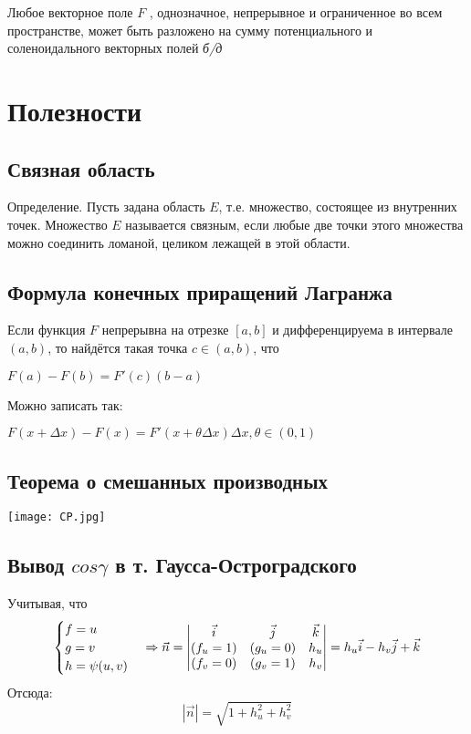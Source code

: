 \documentclass[12pt]{article}
\begin{document}
		Любое векторное поле $F$ , однозначное, непрерывное и ограниченное во всем пространстве, может быть разложено на сумму потенциального и соленоидального векторных полей	
	\textit{б/д}
	
	
	
	
	
	
	
	
	
	
	
\newpage
\section{Полезности}
\subsection{Связная область}\label{eq4}
Определение. Пусть задана область $E$, т.е. множество, состоящее из внутренних точек. Множество $E$ называется связным, если любые две точки этого
множества можно соединить ломаной, целиком лежащей в этой области.

\subsection{Формула конечных приращений Лагранжа}\label{eq5}	
Если функция $F$ непрерывна на отрезке $[a,b]$  и дифференцируема в интервале $(a,b)$, то найдётся такая точка $ c\in (a,b)$, что
 
	$F(a) - F(b) = F'(c)(b - a)$
	
	Можно записать так:
	
	$F(x + \Delta x) - F(x) = F'(x + \theta\Delta x)\Delta x , \theta \in (0,1) $

\subsection{Теорема о смешанных производных}\label{eq6}
\texttt{[image: CP.jpg]}	

\subsection{Вывод $cos\gamma$ в т. Гаусса-Остроградского}\label{eq10}
Учитывая, что 
$$
\begin{cases}
   f = u \\
   g = v \\
   h = \psi(u,v)
\end{cases}
\Rightarrow
\vec{n} = 
\begin{vmatrix}
\vec{i} & \vec{j} & \vec{k} \\
(f_u = 1) & (g_u = 0) & h_u \\
(f_v = 0) & (g_v = 1) & h_v 
\end{vmatrix}
=
\-h_u \vec{i} - h_v \vec{j} + \vec{k}
$$
Отсюда:
$$
|\vec{n}| = \sqrt{1+h_u^2 + h_v^2}
$$
\end{document}
